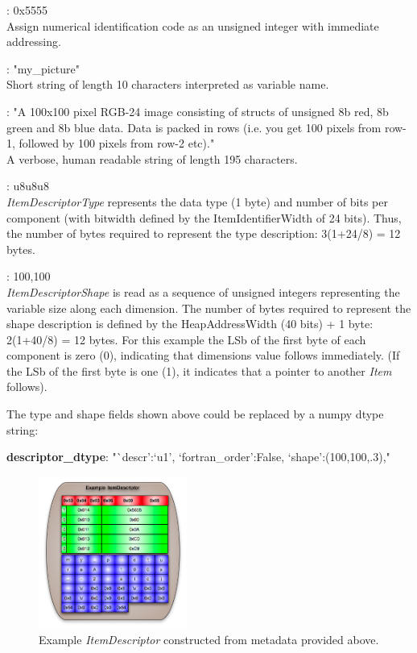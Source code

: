 \documentclass[11pt,english,twoside]{article}
\begin{document}
\begin{description}
\setlength{\itemindent}{0.5cm}
\setlength{\itemsep}{0ex plus0.2ex}
\item[descriptor\_identifier]: 0x5555 \\
Assign numerical identification code as an unsigned integer with immediate addressing.
\item[descriptor\_name]: "my\_picture" \\
Short string of length 10 characters interpreted as variable name.
\item[descriptor\_description]: "A 100x100 pixel RGB-24 image consisting of structs of unsigned 8b red, 8b green and 8b blue data. Data is packed
in rows (i.e. you get 100 pixels from row-1, followed by 100 pixels from row-2 etc)." \\
A verbose, human readable string of length 195 characters.
\item[descriptor\_type]: u8u8u8 \\
\emph{ItemDescriptorType} represents the data type (1 byte) and number of bits per component (with bitwidth defined by the ItemIdentifierWidth of
24 bits). Thus, the number of bytes required to represent the type description: 3(1+24/8) = 12 bytes.
\item[descriptor\_shape]: 100,100 \\
\emph{ItemDescriptorShape} is read as a sequence of unsigned integers representing the variable size along each dimension. The number of bytes
required to represent the shape description is defined by the HeapAddressWidth (40 bits) + 1 byte: 2(1+40/8) = 12 bytes. For this example the
LSb of the first byte of each component is zero (0), indicating that dimensions value follows immediately. (If the LSb of the first byte is one
(1), it indicates that a pointer to another \emph{Item} follows).
\end{description}

The type and shape fields shown above could be replaced by a numpy dtype string:

{\bf descriptor\_dtype}: "`descr':`u1', `fortran\_order':False, `shape':(100,100,.3),"

\begin{figure}[!htb]
\centering
\includegraphics[height=5cm]{images/example_spead_itemdescriptor}
\caption[Example \emph{ItemDescriptor} construct]{\label{fig:example}\small Example \emph{ItemDescriptor} constructed from metadata provided
above.}
\end{figure}
\end{document}
